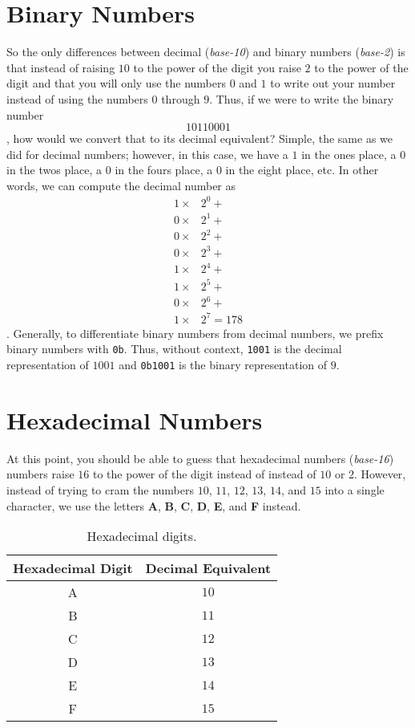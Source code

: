 \documentclass{article}
\begin{document}
\section{Binary Numbers}

So the only differences between decimal (\textit{base-10}) and binary numbers (\textit{base-2}) is that instead of raising $10$ to the power of the digit you raise $2$ to the power of the digit and that you will only use the numbers $0$ and $1$ to write out your number instead of using the numbers $0$ through $9$.
Thus, if we were to write the binary number
\begin{equation}
1011 0001
\end{equation}
, how would we convert that to its decimal equivalent?
Simple, the same as we did for decimal numbers; however, in this case, we have a $1$ in the ones place, a $0$ in the twos place, a $0$ in the fours place, a $0$ in the eight place, etc.
In other words, we can compute the decimal number as
\begin{align}
1 \times & 2^0 + \\
0 \times & 2^1 + \\
0 \times & 2^2 + \\
0 \times & 2^3 + \\
1 \times & 2^4 + \\
1 \times & 2^5 + \\
0 \times & 2^6 + \\
1 \times & 2^7 = 178
\end{align}
.
Generally, to differentiate binary numbers from decimal numbers, we prefix binary numbers with \lstinline{0b}.
Thus, without context, \lstinline{1001} is the decimal representation of $1001$ and \lstinline{0b1001} is the binary representation of $9$.

\section{Hexadecimal Numbers}

At this point, you should be able to guess that hexadecimal numbers (\textit{base-16}) numbers raise $16$ to the power of the digit instead of instead of $10$ or $2$.
However, instead of trying to cram the numbers $10$, $11$, $12$, $13$, $14$, and $15$ into a single character, we use the letters \textbf{A}, \textbf{B}, \textbf{C}, \textbf{D}, \textbf{E}, and \textbf{F} instead.

\begin{table}
\centering
\caption{Hexadecimal digits.}
\begin{tabularx}{0.5\textwidth}{ |C|C| }
\hline
\textbf{Hexadecimal Digit} & \textbf{Decimal Equivalent} \\
\hline
A & $10$ \\
\hline
B & $11$ \\
\hline
C & $12$ \\
\hline
D & $13$ \\
\hline
E & $14$ \\
\hline
F & $15$ \\
\hline
\end{tabularx}
\end{table}
\end{document}
